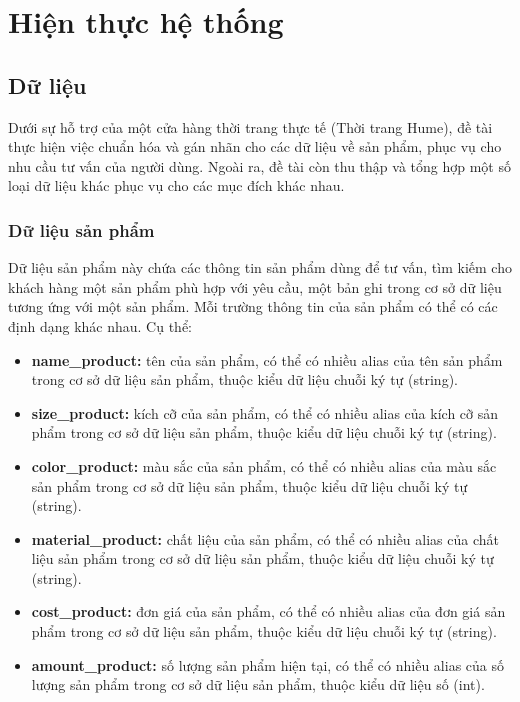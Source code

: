 \chapter{Hiện thực hệ thống}

\section{Dữ liệu}
\label{sec:database}
Dưới sự hỗ trợ của một cửa hàng thời trang thực tế (Thời trang Hume), đề tài thực hiện việc chuẩn hóa và gán nhãn cho các dữ liệu về sản phẩm, phục vụ cho nhu cầu tư vấn của người dùng. Ngoài ra, đề tài còn thu thập và tổng hợp một số loại dữ liệu khác phục vụ cho các mục đích khác nhau.

\subsection{Dữ liệu sản phẩm}
\label{subsec:productdb}
Dữ liệu sản phẩm này chứa các thông tin sản phẩm dùng để tư vấn, tìm kiếm cho khách hàng một sản phẩm phù hợp với yêu cầu, một bản ghi trong cơ sở dữ liệu tương ứng với một sản phẩm. Mỗi trường thông tin của sản phẩm có thể có các định dạng khác nhau. Cụ thể:

\begin{itemize}
    \item \textbf{name\_product:} tên của sản phẩm, có thể có nhiều alias của tên sản phẩm trong cơ sở dữ liệu sản phẩm, thuộc kiểu dữ liệu chuỗi ký tự (string).
    \item \textbf{size\_product:} kích cỡ của sản phẩm, có thể có nhiều alias của kích cỡ sản phẩm trong cơ sở dữ liệu sản phẩm, thuộc kiểu dữ liệu chuỗi ký tự (string).
    \item \textbf{color\_product:} màu sắc của sản phẩm, có thể có nhiều alias của màu sắc sản phẩm trong cơ sở dữ liệu sản phẩm, thuộc kiểu dữ liệu chuỗi ký tự (string).
    \item \textbf{material\_product:} chất liệu của sản phẩm, có thể có nhiều alias của chất liệu sản phẩm trong cơ sở dữ liệu sản phẩm, thuộc kiểu dữ liệu chuỗi ký tự (string).
    \item \textbf{cost\_product:} đơn giá của sản phẩm, có thể có nhiều alias của đơn giá sản phẩm trong cơ sở dữ liệu sản phẩm, thuộc kiểu dữ liệu chuỗi ký tự (string).
    \item \textbf{amount\_product:} số lượng sản phẩm hiện tại, có thể có nhiều alias của số lượng sản phẩm trong cơ sở dữ liệu sản phẩm, thuộc kiểu dữ liệu số (int).
\end{itemize}

